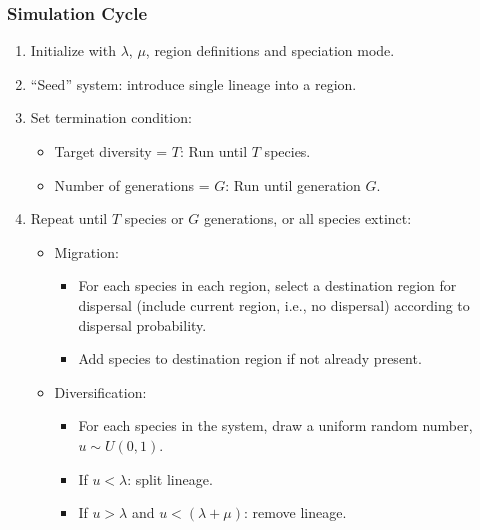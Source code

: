 \documentclass[11pt,t]{beamer}
\begin{document}
\begin{frame}
	\frametitle{Simulation Cycle}
	\begin{enumerate}
		\item Initialize with $\lambda$, $\mu$, region definitions and speciation mode.
		
		\item ``Seed'' system: introduce single lineage into a region.
		
		\item Set termination condition:
			\begin{itemize}
				\item Target diversity = $T$: Run until $T$ species.
				\item Number of generations = $G$: Run until generation $G$.
			\end{itemize}
		
		\item Repeat until $T$ species or $G$ generations, or all species extinct:
			\begin{itemize}
				\item Migration:			
				\begin{itemize} 
					\item For each species in each region, select a destination region for dispersal (include current region, i.e., no dispersal) according to dispersal probability.
					\item Add species to destination region if not already present.
				\end{itemize}
			
				\item Diversification:
				\begin{itemize}	 
					\item For each species in the system, draw a uniform random number, $u \sim U(0,1)$.					
					\item If $u < \lambda$: split lineage.
					\item If $u > \lambda$ and $u < (\lambda + \mu)$: remove lineage.
				\end{itemize}	
			\end{itemize}							
	\end{enumerate}
	
\end{frame}
\end{document}
